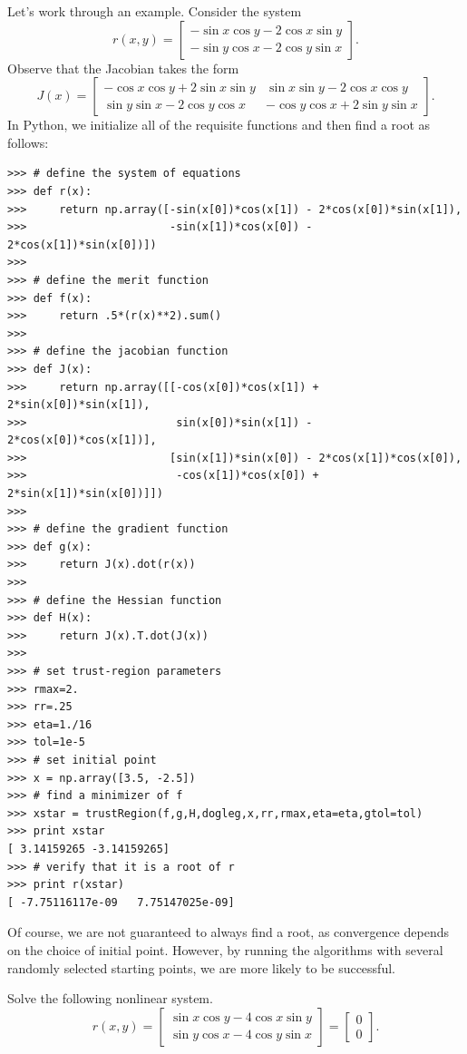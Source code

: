 Let's work through an example. Consider the system
\[
r(x,y) = \begin{bmatrix}
-\sin x\cos y - 2\cos x\sin y\\
-\sin y\cos x - 2\cos y\sin x
\end{bmatrix}.
\]
Observe that the Jacobian takes the form
\[
J(x) = \begin{bmatrix}
-\cos x\cos y + 2\sin x\sin y & \sin x\sin y - 2\cos x\cos y\\
\sin y\sin x - 2\cos y\cos x & -\cos y\cos x + 2\sin y \sin x
\end{bmatrix}.
\]
In Python, we initialize all of the requisite functions and then find a root as follows:
\begin{lstlisting}
>>> # define the system of equations
>>> def r(x):
>>>     return np.array([-sin(x[0])*cos(x[1]) - 2*cos(x[0])*sin(x[1]),
>>>                      -sin(x[1])*cos(x[0]) - 2*cos(x[1])*sin(x[0])])
>>>
>>> # define the merit function
>>> def f(x):
>>>     return .5*(r(x)**2).sum()
>>>
>>> # define the jacobian function
>>> def J(x):
>>>     return np.array([[-cos(x[0])*cos(x[1]) + 2*sin(x[0])*sin(x[1]),
>>>                       sin(x[0])*sin(x[1]) - 2*cos(x[0])*cos(x[1])],
>>>                      [sin(x[1])*sin(x[0]) - 2*cos(x[1])*cos(x[0]),
>>>                       -cos(x[1])*cos(x[0]) + 2*sin(x[1])*sin(x[0])]])
>>>
>>> # define the gradient function
>>> def g(x):
>>>     return J(x).dot(r(x))
>>>
>>> # define the Hessian function
>>> def H(x):
>>>     return J(x).T.dot(J(x))
>>>
>>> # set trust-region parameters
>>> rmax=2.
>>> rr=.25
>>> eta=1./16
>>> tol=1e-5
>>> # set initial point
>>> x = np.array([3.5, -2.5])
>>> # find a minimizer of f
>>> xstar = trustRegion(f,g,H,dogleg,x,rr,rmax,eta=eta,gtol=tol)
>>> print xstar
[ 3.14159265 -3.14159265]
>>> # verify that it is a root of r
>>> print r(xstar)
[ -7.75116117e-09   7.75147025e-09]
\end{lstlisting}

Of course, we are not guaranteed to always find a root, as convergence depends on the choice of initial point.
However, by running the algorithms with several randomly selected starting points, we are more likely to 
be successful.
\begin{problem}
Solve the following nonlinear system.
\[
r(x,y) = \begin{bmatrix}
\sin x\cos y - 4\cos x\sin y\\
\sin y\cos x - 4\cos y\sin x
\end{bmatrix} 
= \begin{bmatrix}
0\\
0
\end{bmatrix}.
\]
\end{problem}

